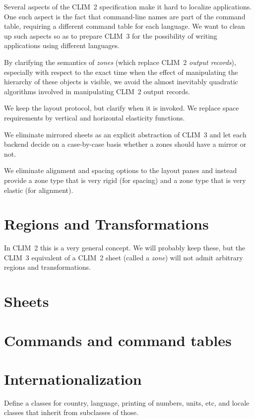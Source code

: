 \documentclass{report}
\def\clim{CLIM~3}
\def\climtwo{CLIM~2}
\begin{document}
Several aspects of the \climtwo{} specification make it hard to
localize applications.  One such aspect is the fact that command-line
names are part of the command table, requiring a different command
table for each language.  We want to clean up such aspects so as to
prepare \clim{} for the possibility of writing applications using
different languages. 

By clarifying the semantics of \emph{zones} (which replace \climtwo{}
\emph{output records}), especially with respect to the exact time when
the effect of manipulating the hierarchy of these objects is visible,
we avoid the almost inevitably quadratic algorithms involved in
manipulating \climtwo{} output records. 

We keep the layout protocol, but clarify when it is invoked.  We
replace space requirements by vertical and horizontal elasticity
functions. 

We eliminate mirrored sheets as an explicit abstraction of \clim{} and
let each backend decide on a case-by-case basis whether a zones should
have a mirror or not.

We eliminate alignment and spacing options to the layout panes and
instead provide a zone type that is very rigid (for spacing) and a
zone type that is very elastic (for alignment).

\section{Regions and Transformations}

In \climtwo{} this is a very general concept.  We will probably keep
these, but the \clim{} equivalent of a \climtwo{} sheet (called a
\emph{zone}) will not admit arbitrary regions and transformations. 

\section{Sheets}

\section{Commands and command tables}

\section{Internationalization}

Define a classes for country, language, printing of numbers, units,
etc, and locale classes that inherit from subclasses of those.
\end{document}
